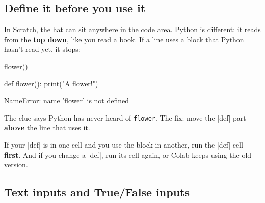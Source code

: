 \subsection*{Define it before you use it}

In Scratch, the  hat can sit anywhere in the code area. Python is different: it reads from the \textbf{top down}, like you read a book. If a line uses a block that Python hasn't read yet, it stops:

\begin{code}
flower()

def flower():
    print("A flower!")
\end{code}
\begin{errorbox}
NameError: name 'flower' is not defined
\end{errorbox}

The clue says Python has never heard of \texttt{flower}. The fix: move the \py|def| part \textbf{above} the line that uses it.

\begin{watchout}
If your \py|def| is in one cell and you use the block in another, run the \py|def| cell \textbf{first}. And if you change a \py|def|, run its cell again, or Colab keeps using the old version.
\end{watchout}

\subsection*{Text inputs and True/False inputs}

